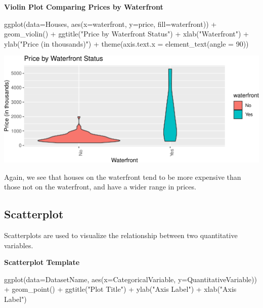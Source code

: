 \documentclass[
  letterpaper,
  DIV=11,
  numbers=noendperiod]{scrreprt}
\newenvironment{Shaded}{\begin{snugshade}}{\end{snugshade}}
\newcommand{\AttributeTok}[1]{\textcolor[rgb]{0.40,0.45,0.13}{#1}}
\newcommand{\DecValTok}[1]{\textcolor[rgb]{0.68,0.00,0.00}{#1}}
\newcommand{\FunctionTok}[1]{\textcolor[rgb]{0.28,0.35,0.67}{#1}}
\newcommand{\NormalTok}[1]{\textcolor[rgb]{0.00,0.23,0.31}{#1}}
\newcommand{\SpecialCharTok}[1]{\textcolor[rgb]{0.37,0.37,0.37}{#1}}
\newcommand{\StringTok}[1]{\textcolor[rgb]{0.13,0.47,0.30}{#1}}
\begin{document}
\textbf{Violin Plot Comparing Prices by Waterfront}

\begin{Shaded}
\begin{Highlighting}[]
\FunctionTok{ggplot}\NormalTok{(}\AttributeTok{data=}\NormalTok{Houses, }\FunctionTok{aes}\NormalTok{(}\AttributeTok{x=}\NormalTok{waterfront, }\AttributeTok{y=}\NormalTok{price, }\AttributeTok{fill=}\NormalTok{waterfront)) }\SpecialCharTok{+} 
  \FunctionTok{geom\_violin}\NormalTok{() }\SpecialCharTok{+} 
  \FunctionTok{ggtitle}\NormalTok{(}\StringTok{"Price by Waterfront Status"}\NormalTok{) }\SpecialCharTok{+} 
  \FunctionTok{xlab}\NormalTok{(}\StringTok{"Waterfront"}\NormalTok{) }\SpecialCharTok{+} \FunctionTok{ylab}\NormalTok{(}\StringTok{"Price (in thousands)"}\NormalTok{) }\SpecialCharTok{+} 
  \FunctionTok{theme}\NormalTok{(}\AttributeTok{axis.text.x =} \FunctionTok{element\_text}\NormalTok{(}\AttributeTok{angle =} \DecValTok{90}\NormalTok{))}
\end{Highlighting}
\end{Shaded}

\includegraphics{Ch1_files/figure-pdf/unnamed-chunk-21-1.pdf}

Again, we see that houses on the waterfront tend to be more expensive
than those not on the waterfront, and have a wider range in prices.

\subsection{Scatterplot}\label{scatterplot}

Scatterplots are used to visualize the relationship between two
quantitative variables.

\textbf{Scatterplot Template}

\begin{Shaded}
\begin{Highlighting}[]
\FunctionTok{ggplot}\NormalTok{(}\AttributeTok{data=}\NormalTok{DatasetName, }\FunctionTok{aes}\NormalTok{(}\AttributeTok{x=}\NormalTok{CategoricalVariable, }\AttributeTok{y=}\NormalTok{QuantitativeVariable)) }\SpecialCharTok{+} 
  \FunctionTok{geom\_point}\NormalTok{() }\SpecialCharTok{+}
  \FunctionTok{ggtitle}\NormalTok{(}\StringTok{"Plot Title"}\NormalTok{) }\SpecialCharTok{+} 
  \FunctionTok{ylab}\NormalTok{(}\StringTok{"Axis Label"}\NormalTok{) }\SpecialCharTok{+} 
  \FunctionTok{xlab}\NormalTok{(}\StringTok{"Axis Label"}\NormalTok{)}
\end{Highlighting}
\end{Shaded}
\end{document}

